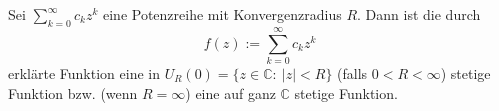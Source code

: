 Sei $\sum_{k=0}^\infty c_k z^k$ eine Potenzreihe mit Konvergenzradius $R$. Dann ist die durch
$$f(z) := \sum_{k=0}^{\infty} c_k z^k$$
erklärte Funktion eine in $U_R(0) = \{z \in \mathbb{C} : \ |z| < R\}$ (falls $0<R<\infty$) stetige Funktion bzw. (wenn $R=\infty$) eine auf ganz $\mathbb{C}$ stetige Funktion.
